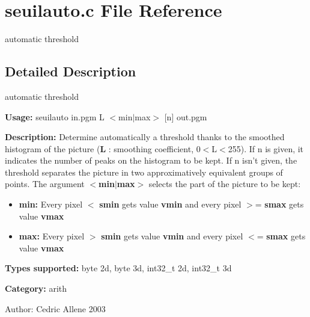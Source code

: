 \section{seuilauto.c File Reference}
\label{seuilauto_8c}
automatic threshold  




\label{_details}
\subsection{Detailed Description}
automatic threshold 

{\bf Usage:} seuilauto in.pgm L $<$min$|$max$>$ [n] out.pgm

{\bf Description:} Determine automatically a threshold thanks to the smoothed histogram of the picture ({\bf L} : smoothing coefficient, 0$<$L$<$255). If n is given, it indicates the number of peaks on the histogram to be kept. If n isn't given, the threshold separates the picture in two approximatively equivalent groups of points. The argument {\bf $<$min$|$max$>$} selects the part of the picture to be kept:

\begin{itemize}
\item {\bf min:} Every pixel $<$ {\bf smin} gets value {\bf vmin} and every pixel $>$= {\bf smax} gets value {\bf vmax} \item {\bf max:} Every pixel $>$ {\bf smin} gets value {\bf vmin} and every pixel $<$= {\bf smax} gets value {\bf vmax} \end{itemize}
{\bf Types supported:} byte 2d, byte 3d, int32\_\-t 2d, int32\_\-t 3d

{\bf Category:} arith

\begin{Desc}
\item[Author:]Cedric Allene 2003 \end{Desc}

